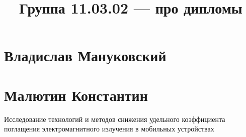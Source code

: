 \documentclass{article}
\title{Группа 11.03.02 --- про дипломы}
\begin{document}
\section*{Владислав Мануковский}

\section*{Малютин Константин}
Исследование технологий и методов снижения удельного коэффициента поглащения электромагнитного излучения в мобильных устройствах
\end{document}
